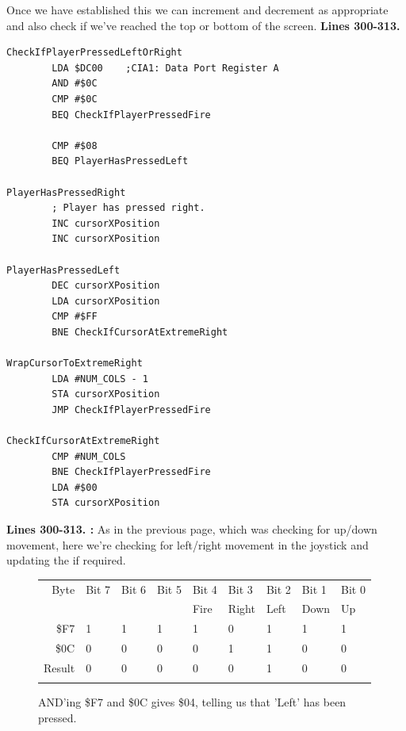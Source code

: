 Once we have established this we can increment and decrement  as appropriate and also check
if we've reached the top or bottom of the screen. 
\clearpage
\textbf{Lines 300-313. }
\begin{lstlisting}[caption= Second part of the Interrupt Handler.]
CheckIfPlayerPressedLeftOrRight   
        LDA $DC00    ;CIA1: Data Port Register A
        AND #$0C
        CMP #$0C
        BEQ CheckIfPlayerPressedFire

        CMP #$08
        BEQ PlayerHasPressedLeft

PlayerHasPressedRight
        ; Player has pressed right.
        INC cursorXPosition
        INC cursorXPosition

PlayerHasPressedLeft   
        DEC cursorXPosition
        LDA cursorXPosition
        CMP #$FF
        BNE CheckIfCursorAtExtremeRight

WrapCursorToExtremeRight
        LDA #NUM_COLS - 1
        STA cursorXPosition
        JMP CheckIfPlayerPressedFire

CheckIfCursorAtExtremeRight   
        CMP #NUM_COLS
        BNE CheckIfPlayerPressedFire
        LDA #$00
        STA cursorXPosition

\end{lstlisting}
\clearpage
{}
\textbf{Lines 300-313. :} As in the previous page, which was checking
for up/down movement, here we're checking for left/right movement in the joystick and updating the  if required.

\begin{figure}[H]
  {
    \setlength{\tabcolsep}{3.0pt}
    \setlength\cmidrulewidth{\heavyrulewidth} %
    \begin{adjustbox}{width=7cm,center}

      \begin{tabular}{rllllllll}
        \toprule
        Byte & Bit 7 & Bit 6 & Bit 5 & Bit 4 & Bit 3 & Bit 2 & Bit 1 & Bit 0        \\
             &       &       &       & Fire  & Right & Left  & Down  & Up           \\
        \midrule
        \$F7 & 1 & 1 & 1 & 1 & 0 & 1 & 1 & 1 \\
        \$0C & 0 & 0 & 0 & 0 & 1 & 1 & 0 & 0 \\
        \midrule
        Result & 0 & 0 & 0 & 0 & 0 & 1 & 0 & 0 \\
        \addlinespace
        \bottomrule
      \end{tabular}
    \end{adjustbox}
    }\caption*{AND'ing \$F7 and \$0C gives \$04, telling us that 'Left' has been pressed.}
\end{figure}

